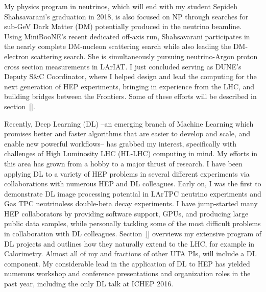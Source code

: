 My physics program in neutrinos, which will end with my student
Sepideh Shahsavarani's graduation in 2018, is also focused on NP
through searches for sub-GeV Dark Matter (DM) potentially produced in
the neutrino beamline. Using MiniBooNE's recent dedicated off-axis
run, Shahsavarani participates in the nearly complete DM-nucleon
scattering search while also leading the DM-electron scattering
search. She is simultaneously pursuing neutrino-Argon proton cross
section measurements in LArIAT. I just concluded serving as DUNE's
Deputy S\&C Coordinator, where I helped design and lead the computing
for the next generation of HEP experiments, bringing in experience
from the LHC, and building bridges between the Frontiers. Some of
these efforts will be described in section~\ref{}.

Recently, Deep Learning (DL) --an emerging branch of Machine Learning
which promises better and faster algorithms that are easier to develop
and scale, and enable new powerful workflows-- has grabbed my
interest, specifically with challenges of High Luminosity LHC (HL-LHC)
computing in mind. My efforts in this area has grown from a hobby to a
major thrust of research. I have been applying DL to a variety of HEP
problems in several different experiments via collaborations with
numerous HEP and DL colleagues. Early on, I was the first to
demonstrate DL image processing potential in LArTPC neutrino
experiments and Gas TPC neutrinoless double-beta decay experiments. I
have jump-started many HEP collaborators by providing software
support, GPUs, and producing large public data samples, while
personally tackling some of the most difficult problems in
collaboration with DL colleagues. Section~\ref{} overviews my
extensive program of DL projects and outlines how they naturally
extend to the LHC, for example in Calorimetry. Almost all of my and
fractions of other UTA PIs, will include a DL component. My
considerable lead in the application of DL to HEP has yielded numerous
workshop and conference presentations and organization roles in the
past year\cite{}, including the only DL talk at ICHEP 2016\cite{}.



